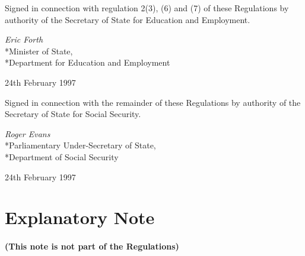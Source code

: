 \documentclass[12pt,a4paper]{article}
\begin{document}
\bigskip

Signed in connection with regulation 2(3), (6) and (7) of these Regulations by authority of the Secretary of State for Education and Employment.

{\raggedleft
\emph{Eric Forth}\\*Minister of
State,\\*Department for Education and Employment

}

24th February 1997

\bigskip

Signed in connection with the remainder of these Regulations by authority of the Secretary of State for Social Security.

{\raggedleft
\emph{Roger Evans}\\*Parliamentary Under-Secretary of
State,\\*Department of Social Security

}

24th February 1997

\small

\part{Explanatory Note}

\renewcommand\parthead{--- Explanatory Note}

\subsection*{(This note is not part of the Regulations)}
\end{document}
